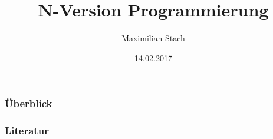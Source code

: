 \documentclass{beamer}
\title[N-Version Programmierung]{N-Version Programmierung} %
\author{Maximilian Stach} %
\institute[TU Dortmund] %
{
Technische Universität Dortmund \\ %
\medskip
}
\date{14.02.2017} %
\begin{document}
\begin{frame}
\titlepage %
\end{frame}

\begin{frame}
\frametitle{Überblick} %
\tableofcontents %
\end{frame}





%

\begin{frame}[allowframebreaks]
	\frametitle{Literatur}
	
	
\end{frame}

%
\end{document}
